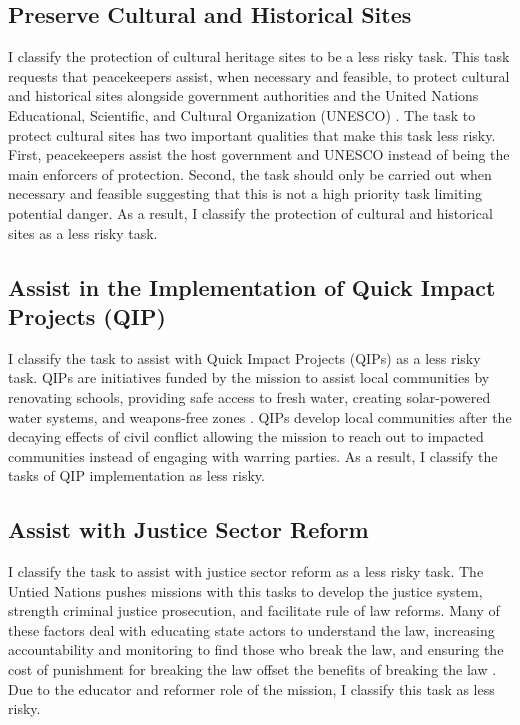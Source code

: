 \subsection*{Preserve Cultural and Historical Sites}

I classify the protection of cultural heritage sites to be a less risky task. This task requests that peacekeepers assist, when necessary and feasible, to protect cultural and historical sites alongside government authorities and the United Nations Educational, Scientific, and Cultural Organization (UNESCO) \citep{TAMM_Codebook}. The task to protect cultural sites has two important qualities that make this task less risky. First, peacekeepers assist the host government and UNESCO instead of being the main enforcers of protection. Second, the task should only be carried out when necessary and feasible suggesting that this is not a high priority task limiting potential danger. As a result, I classify the protection of cultural and historical sites as a less risky task. 

\subsection*{Assist in the Implementation of Quick Impact Projects (QIP)}

I classify the task to assist with Quick Impact Projects (QIPs) as a less risky task. QIPs are initiatives funded by the mission to assist local communities by renovating schools, providing safe access to fresh water, creating solar-powered water systems, and weapons-free zones \citep{QIP}. QIPs develop local communities after the decaying effects of civil conflict allowing the mission to reach out to impacted communities instead of engaging with warring parties. As a result, I classify the tasks of QIP implementation as less risky. 

\subsection*{Assist with Justice Sector Reform}

I classify the task to assist with justice sector reform as a less risky task. The Untied Nations pushes missions with this tasks to develop the justice system, strength criminal justice prosecution, and facilitate rule of law reforms. Many of these factors deal with educating state actors to understand the law, increasing accountability and monitoring to find those who break the law, and ensuring the cost of punishment for breaking the law offset the benefits of breaking the law \citep{blair2021}. Due to the educator and reformer role of the mission, I classify this task as less risky. 

